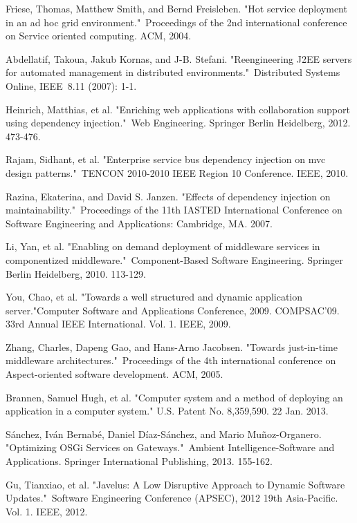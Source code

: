 \documentclass[conference]{IEEEtran}
\begin{document}
\begin{thebibliography}{9}
Friese, Thomas, Matthew Smith, and Bernd Freisleben. "Hot service deployment in an ad hoc grid environment." Proceedings of the 2nd international conference on Service oriented computing. ACM, 2004.

Abdellatif, Takoua, Jakub Kornas, and J-B. Stefani. "Reengineering J2EE servers for automated management in distributed environments." Distributed Systems Online, IEEE 8.11 (2007): 1-1.

Heinrich, Matthias, et al. "Enriching web applications with collaboration support using dependency injection." Web Engineering. Springer Berlin Heidelberg, 2012. 473-476.

Rajam, Sidhant, et al. "Enterprise service bus dependency injection on mvc design patterns." TENCON 2010-2010 IEEE Region 10 Conference. IEEE, 2010.

Razina, Ekaterina, and David S. Janzen. "Effects of dependency injection on maintainability." Proceedings of the 11th IASTED International Conference on Software Engineering and Applications: Cambridge, MA. 2007.

Li, Yan, et al. "Enabling on demand deployment of middleware services in componentized middleware." Component-Based Software Engineering. Springer Berlin Heidelberg, 2010. 113-129.

You, Chao, et al. "Towards a well structured and dynamic application server."Computer Software and Applications Conference, 2009. COMPSAC'09. 33rd Annual IEEE International. Vol. 1. IEEE, 2009.

Zhang, Charles, Dapeng Gao, and Hans-Arno Jacobsen. "Towards just-in-time middleware architectures." Proceedings of the 4th international conference on Aspect-oriented software development. ACM, 2005.

Brannen, Samuel Hugh, et al. "Computer system and a method of deploying an application in a computer system." U.S. Patent No. 8,359,590. 22 Jan. 2013.

Sánchez, Iván Bernabé, Daniel Díaz-Sánchez, and Mario Muñoz-Organero. "Optimizing OSGi Services on Gateways." Ambient Intelligence-Software and Applications. Springer International Publishing, 2013. 155-162.

Gu, Tianxiao, et al. "Javelus: A Low Disruptive Approach to Dynamic Software Updates." Software Engineering Conference (APSEC), 2012 19th Asia-Pacific. Vol. 1. IEEE, 2012.

\end{thebibliography}


\end{document}

